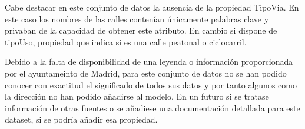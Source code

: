 Cabe destacar en este conjunto de datos la ausencia de la propiedad TipoVia. En este caso los nombres de las calles contenían únicamente palabras clave y privaban de la capacidad de obtener este atributo. En cambio si dispone de tipoUso, propiedad que indica si es una calle peatonal o ciclocarril.


Debido a la falta de disponibilidad de una leyenda o información proporcionada por el ayuntameinto de Madrid, para este conjunto de datos no se han podido conocer con exactitud el significado de todos sus datos y por tanto algunos como la dirección no han podido añadirse al modelo. En un futuro si se tratase información de otras fuentes o se añadiese una documentación detallada para este dataset, si se podría añadir esa propiedad.





